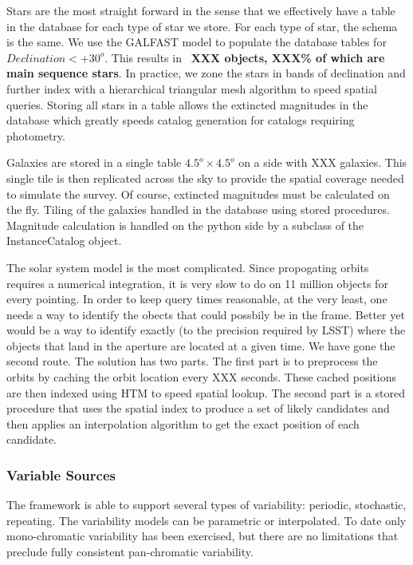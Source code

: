 \documentclass[]{article}
\begin{document}
Stars are the most straight forward in the sense that we effectively have a table in the database for each type of star
we store.  For each type of star, the schema is the same.  We use the GALFAST model to populate the database tables
for $Declination < +30^o$.  This results in ~{\bf XXX objects, XXX\% of which are main sequence stars}.  In practice, we
zone the stars in bands of declination and further index with a hierarchical triangular mesh algorithm to speed spatial queries.
Storing all stars in a table allows the extincted magnitudes in the database which greatly speeds catalog generation for 
catalogs requiring photometry.

Galaxies are stored in a single table $4.5^o \times 4.5^o$ on a side with XXX galaxies. This single tile is then replicated across the sky to 
provide the spatial coverage needed to simulate the survey.  Of course, extincted magnitudes must be calculated on the fly.
Tiling of the galaxies handled in the database using stored procedures.  Magnitude calculation is handled on the python side
by a subclass of the InstanceCatalog object.

The solar system model is the most complicated.  Since propogating orbits requires a numerical integration, it is very slow to do on 
11 million objects for every pointing.  In order to keep query times reasonable, at the very least, one needs a way to 
identify the obects that could possbily be in the frame.  Better yet would be a way to identify exactly (to the precision
required by LSST) where the objects that land in the aperture are located at a given time.  We have gone the second route.
The solution has two parts.  The first part is to preprocess the orbits by caching the orbit location every XXX seconds. 
These cached positions are then indexed using HTM to speed spatial lookup.
The second part is a stored procedure that uses the spatial index to produce a set of likely candidates and then applies
an interpolation algorithm to get the exact position of each candidate.

\subsubsection{Variable Sources}
The framework is able to support several types of variability: periodic, stochastic, repeating.  The variability models can be parametric or interpolated.  
To date only mono-chromatic variability has been exercised, but there are no limitations that preclude fully consistent pan-chromatic variability.
\end{document}
